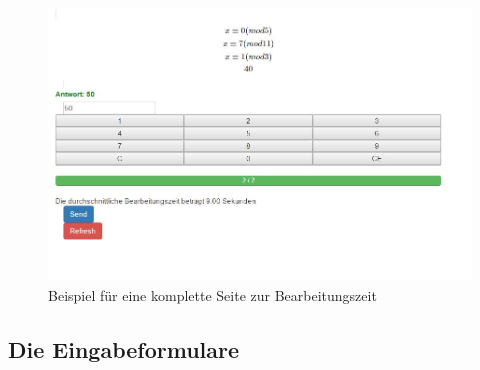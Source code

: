\begin{figure}[htp]     %
\centering
\includegraphics[width=1\textwidth]{bilder/TotalClient} 
\caption[Beispiel für eine komplette Seite zur Bearbeitungszeit]{Beispiel für eine komplette Seite zur Bearbeitungszeit}
\end{figure} 


\subsection{Die Eingabeformulare}

